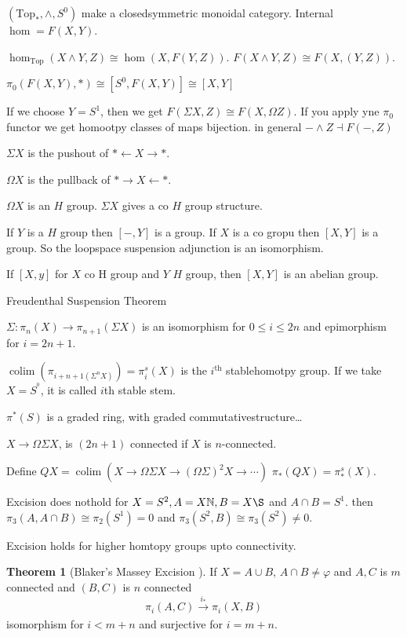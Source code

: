 \documentclass[notitlepage, 12pt]{article}
\newcommand{\N}{\mathbb{N}}
\theoremstyle{definition}
\newtheorem{theorem}{Theorem}[section]
\theoremstyle{para}
\begin{document}
  $(\mathrm{Top_{\ast} } ,\wedge, S^0)$ make a closedsymmetric monoidal category. Internal $\hom=F(X,Y)$. 

  $\hom_{\mathrm{Top } }(X\wedge Y,Z)\cong \hom(X,F(Y,Z))$. 
 $F(X\wedge Y ,Z)\cong F(X,(Y,Z))$. 


$\pi_0(F(X,Y),\ast)\cong [S^0,F(X,Y)]\cong [X,Y]$

If we choose $Y=S^1$, then we get $F(\Sigma X,Z)\cong F(X,\Omega Z)$. If you apply yne $\pi_0$ functor we get homootpy classes of maps bijection.  in general $-\wedge Z \dashv F(-,Z)$

$\Sigma X$ is the pushout of $\ast \leftarrow X\to \ast$. 

$\Omega X$ is the pullback of $\ast \to X\leftarrow \ast$. 

$\Omega X$ is an $H$ group. $\Sigma X$ gives a co $H$ group structure. 

If $Y$ is a $H$ group then $[-,Y]$ is a group. If $X$ is a co gropu then $[X,Y]$ is a group. So the loopspace suspension adjunction is an isomorphism. 

If $[X,y]$ for $X$ co H group and $Y$ $H$ group, then $[X,Y]$ is an abelian group. 

Freudenthal Suspension Theorem 

$\Sigma :\pi_n(X)\to \pi_{n+1 }(\Sigma X)$ is an isomorphism for $0\leq i\leq 2n$ and epimorphism for $i=2n+1$. 

$\mathop{\mathrm{colim }}(\pi_{i+n+1 (\Sigma^n X)})=\pi_i^s(X)$ is the $i^{\text{th}  }$ stablehomotpy group. If we take $X=S^^0$, it is called 
$i$th stable stem. 

$\pi^*(S)$ is a graded ring, with graded commutativestructure\dots

$X\to \Omega \Sigma X$, is $(2n+1)$ connected if $X$ is $n$-connected. 

Define $QX=\mathop{\mathrm{colim }}(X\to \Omega \Sigma X\to (\Omega \Sigma)^2X\to \cdots )$ $\pi_*(QX)=\pi_*^s(X)$. 

Excision does nothold for $X=S^2,A=X\N, B=X\S$ and $A\cap B=S^1$. then $\pi_3(A,A\cap B)\cong \pi_2(S^1)=0$ and $\pi_3(S^2, B)\cong \pi_3(S^2)\neq 0$. 

Excision holds for higher homtopy groups upto connectivity. 

\begin{theorem}[Blaker's Massey Excision ]
If $X=A\cup B$, $A\cap B\neq \varphi$ and $A, C$ is $m$ connected and $(B,C)$ is $n$ connected
\[
  \pi_i(A,C)\xrightarrow[ ]{i_* }\pi_i(X,B)
\] isomorphism for $i<m+n$ and surjective for $i=m+n$. 
\end{theorem}
\end{document}
